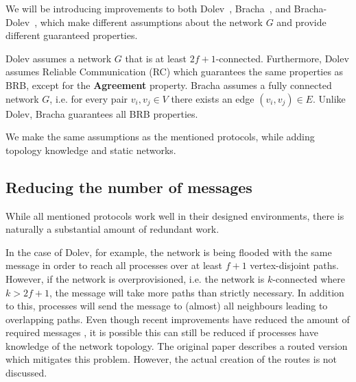 
We will be introducing improvements to both Dolev~\cite{dolev}, Bracha~\cite{bracha}, and Bracha-Dolev~\cite{bracha-dolev}, which make different assumptions about the network $G$ and provide different guaranteed properties. 


Dolev assumes a network $G$ that is at least $2f+1$-connected.
Furthermore, Dolev assumes Reliable Communication (RC) which guarantees the same properties as BRB, except for the \textbf{Agreement} property. Bracha assumes a fully connected network $G$, i.e. for every pair $v_i,v_j \in V$ there exists an edge $(v_i, v_j) \in E$. Unlike Dolev, Bracha guarantees all BRB properties.

We make the same assumptions as the mentioned protocols, while adding topology knowledge and static networks.

\subsection*{Reducing the number of messages}

While all mentioned protocols work well in their designed environments, there is naturally a substantial amount of redundant work.

In the case of Dolev, for example, the network is being flooded with the same message in order to reach all processes over at least $f+1$ vertex-disjoint paths. However, if the network is overprovisioned, i.e. the network is $k$-connected where $k > 2f+1$, the message will take more paths than strictly necessary. In addition to this, processes will send the message to (almost) all neighbours leading to overlapping paths. Even though recent improvements have reduced the amount of required messages 
, it is possible this can still be reduced if processes have knowledge of the network topology. The original paper describes a routed version which mitigates this problem. However, the actual creation of the routes is not discussed.

